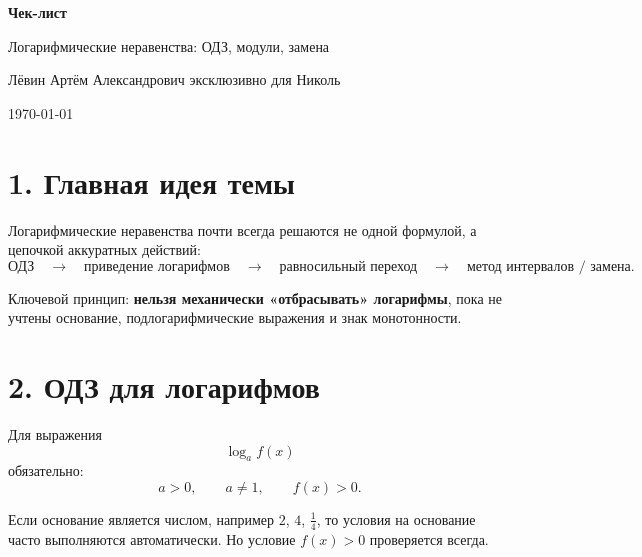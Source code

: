 \documentclass[a4paper,12pt]{article}
\newcommand{\important}[1]{\textcolor{darkaccent}{\textbf{#1}}}
\begin{document}
\begin{titlepage}
\thispagestyle{empty}
\centering
\vspace*{0.18\textheight}

{\Huge\bfseries\textcolor{darkaccent}{Чек-лист}\par}
\vspace{0.8em}
{\LARGE Логарифмические неравенства: ОДЗ, модули, замена\par}

\vspace{2.5em}
{\large Лёвин Артём Александрович эксклюзивно для Николь\par}

\vspace{1.2em}
{\large \today\par}

\vfill

\end{titlepage}

\section*{1. Главная идея темы}

Логарифмические неравенства почти всегда решаются не одной формулой, а цепочкой аккуратных действий:
\[
\text{ОДЗ} \quad \longrightarrow \quad
\text{приведение логарифмов} \quad \longrightarrow \quad
\text{равносильный переход} \quad \longrightarrow \quad
\text{метод интервалов / замена}.
\]

Ключевой принцип: \important{нельзя механически «отбрасывать» логарифмы}, пока не учтены основание, подлогарифмические выражения и знак монотонности.

\section*{2. ОДЗ для логарифмов}

Для выражения
\[
\log_a f(x)
\]
обязательно:
\[
a>0,\qquad a\ne1,\qquad f(x)>0.
\]

Если основание является числом, например \(2\), \(4\), \(\frac14\), то условия на основание часто выполняются автоматически. Но условие \(f(x)>0\) проверяется всегда.
\end{document}
